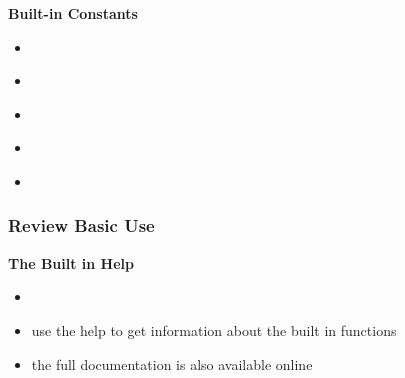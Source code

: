 \documentclass[fleqn]{beamer} %
\newcommand{\sectionIIsubsectionIIItitle}{Review Basic Use}
\begin{document}
\begin{frame}
				\textbf{ Built-in Constants} \\		
				\begin{multicols}{2}
				\begin{itemize}
					\item {} \vspace{1mm}\\
					\item {} \vspace{1mm}\\
					\item {} \vspace{1mm}\\
					\item {} \vspace{1mm}\\
					\item {} \vspace{1mm}\\
				\end{itemize}
				\end{multicols}	
			
				\btVFill 
			\end{frame}

			\begin{frame}
				\frametitle{\sectionIIsubsectionIIItitle}
				\bigskip

				\textbf{The Built in Help } \vspace{3mm}\\
				\begin{itemize}	
					\item 	{} \vspace{3mm}\\
					\item use the help to get information about the built in functions  \vspace{3mm}\\
					\item the full documentation is also available online  \vspace{3mm}\\
				\end{itemize}	
			
				\btVFill 
			\end{frame}
\end{document}
